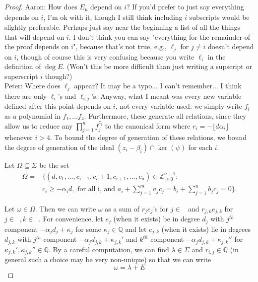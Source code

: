 \documentclass{amsart}
\theoremstyle{plain}
\theoremstyle{definition}
\theoremstyle{remark}
\numberwithin{equation}{section}
\newcommand\bq{{\mathbb Q}}
\newcommand\bz{{\mathbb Z}}
\newcommand\bida{a}
\newcommand\bidb{b}
\DeclareMathOperator{\Te}{T_=}
\DeclareMathOperator{\Tp}{T_+}
\DeclareMathOperator{\Tm}{T_-}
\begin{document}
\begin{proof}
{Aaron: How does $E_\mu$ depend on $i$? If you'd prefer to just say everything depends on $i$, I'm ok with it, though I still think including $i$ subscripts would be slightly
preferable. Perhaps just say near the beginning a list of all the things that will depend on $i$. I don't think you can say "everything for the remainder of the proof depends on i", because that's not true, e.g., $\ell_j$ for $j \neq i$ doesn't depend on $i$, though of course this is very confusing because you write $\ell_i$ in the definition of $\deg E$. (Won't this be more difficult than just writing a supscript or superscript $i$ though?)
\\
Peter: Where does $\ell_j$ appear?  It may be a typo... I can't remember...  I think there are only $\ell_i$'s and $\ell_{i,j}$'s.  Anyway, what I meant was every new variable defined after this point depends on $i$, not every variable used.
}
we simply write $f_i$ as a 
polynomial in $f_1, \ldots f_4$. Furthermore, these
generate all relations, since they allow us to reduce any $\prod_{j =
1}^n f_j^{c_j}$ to the canonical form where $r_i = - \lfloor d \alpha_i
\rfloor$ whenever $i > 4$.  To bound the degree of generation of these relations, we bound the degree of generation of the ideal $(z_i - \beta_i) \cap \ker(\psi)$ for each $i$.

Let $\Omega\subseteq \Sigma$ be the 
set
\begin{align*}
	\Omega = & \{(d, c_1, \ldots, c_{i-1}, c_i + 1, c_{i+1}, \ldots , c_n)  \in \bz^{n+1}_{\geq 0} : \\
	& c_i \ge -\alpha_i d, \text{ for all i, and } \bida_i + \sum_{j = 1}^m \bida_j c_j = \bidb_i + \sum_{j=1}^n \bidb_j c_j
= 0 \}.
\end{align*}

Let $\omega\in \Omega$.  Then we can write $\omega$ as a sum of $r_j e_j$'s for $j\in
\Te$ and $r_{j,k}e_{j,k}$ for $j\in \Tp, k\in \Tm$.  
For convenience, let $e_j$ (when it exists) be in degree $d_j$ with $j^{th}$
component $-\alpha_j d_j + \kappa_j$ for some $\kappa_j \in \bq$ and let $e_{j,k}$ (when it exists) lie in
degrees $d_{j,k}$ with $j^{th}$ component $-\alpha_j d_{j,k} + \kappa_{j,k}'$ and $k^{th}$
component $-\alpha_j d_{j,k} + \kappa_{j,k}''$ for $\kappa_{j,k}', \kappa_{j,k}'' \in \bq$.
By a careful computation, we can find $\lambda \in \Sigma$ 
and $r_{i,j} \in \bq$ (in general such a choice may be very non-unique) so that we can write
\begin{equation}\label{eqn:sigma-in-terms-of-lambda/E}
	\omega = \lambda + E
 \end{equation}


\end{proof}
\end{document}
